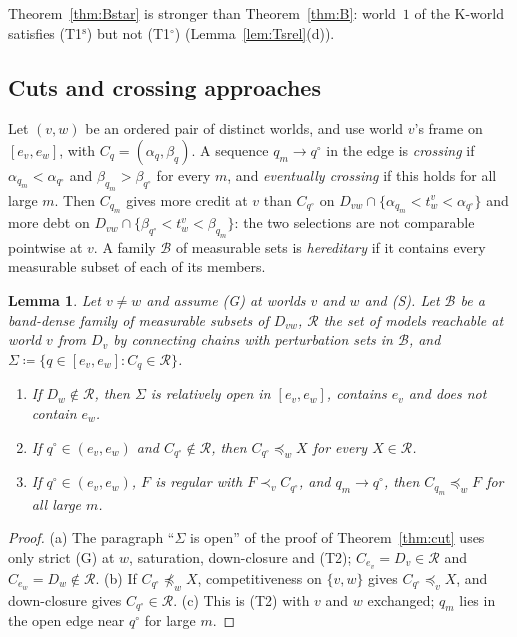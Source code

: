 \documentclass[11pt]{article}
\newtheorem{lemma}[theorem]{Lemma}
\theoremstyle{definition}\newtheorem{definition}[theorem]{Definition}
\theoremstyle{remark}\newtheorem{remark}[theorem]{Remark}
\newcommand{\Bfam}{\mathcal B}
\newcommand{\To}{\textup{(T1$^\circ$)}}
\newcommand{\Ts}{\textup{(T1$^{\mathrm s}$)}}
\begin{document}
Theorem~\ref{thm:Bstar} is stronger than Theorem~\ref{thm:B}: world~$1$ of
the K-world satisfies \Ts{} but not \To{} (Lemma~\ref{lem:Tsrel}(d)).

\subsection{Cuts and crossing approaches}\label{sec:crossing}

Let $(v,w)$ be an ordered pair of distinct worlds, and use world $v$'s frame
on $[e_v,e_w]$, with $C_q=(\alpha_q,\beta_q)$. A sequence $q_m\to q^\circ$ in
the edge is \emph{crossing} if $\alpha_{q_m}<\alpha_{q^\circ}$ and
$\beta_{q_m}>\beta_{q^\circ}$ for every $m$, and \emph{eventually crossing}
if this holds for all large $m$. Then $C_{q_m}$ gives more credit at $v$ than
$C_{q^\circ}$ on $D_{vw}\cap\{\alpha_{q_m}<t^v_w<\alpha_{q^\circ}\}$ and more
debt on $D_{vw}\cap\{\beta_{q^\circ}<t^v_w<\beta_{q_m}\}$: the two
selections are not comparable pointwise at $v$. A family $\Bfam$ of
measurable sets is \emph{hereditary} if it contains every measurable subset
of each of its members.

\begin{lemma}\label{lem:reach}
Let $v\ne w$ and assume (G) at worlds $v$ and $w$ and (S). Let $\Bfam$ be a
band-dense family of measurable subsets of $D_{vw}$, $\mathcal R$ the set of
models reachable at world $v$ from $D_v$ by connecting chains with
perturbation sets in $\Bfam$, and $\Sigma\coloneqq\{q\in[e_v,e_w]:C_q\in
\mathcal R\}$.
\begin{enumerate}[label=(\alph*),leftmargin=*,itemsep=2pt]
\item If $D_w\notin\mathcal R$, then $\Sigma$ is relatively open in
$[e_v,e_w]$, contains $e_v$ and does not contain $e_w$.
\item If $q^\circ\in(e_v,e_w)$ and $C_{q^\circ}\notin\mathcal R$, then
$C_{q^\circ}\preceq_wX$ for every $X\in\mathcal R$.
\item If $q^\circ\in(e_v,e_w)$, $F$ is regular with $F\prec_vC_{q^\circ}$,
and $q_m\to q^\circ$, then $C_{q_m}\preceq_wF$ for all large $m$.
\end{enumerate}
\end{lemma}
\begin{proof}
(a) The paragraph ``$\Sigma$ is open'' of the proof of
Theorem~\ref{thm:cut} uses only strict (G) at $w$, saturation, down-closure
and (T2); $C_{e_v}=D_v\in\mathcal R$ and $C_{e_w}=D_w\notin\mathcal R$.
(b) If $C_{q^\circ}\not\preceq_wX$, competitiveness on $\{v,w\}$ gives
$C_{q^\circ}\preceq_vX$, and down-closure gives $C_{q^\circ}\in\mathcal R$.
(c) This is (T2) with $v$ and $w$ exchanged; $q_m$ lies in the open edge near
$q^\circ$ for large $m$.
\end{proof}
\end{document}
